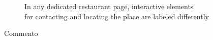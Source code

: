 \begin{itemize}
\begin{figure}[!ht]
\begin{minipage}{\linewidth}
                \captionsetup{justification=centering}
                \caption{In any dedicated restaurant page, interactive elements\\for contacting and locating the place are labeled differently}
                \label{MP3-2}
            \end{minipage}
        \end{figure}
\end{itemize}

\pagebreak
Commento